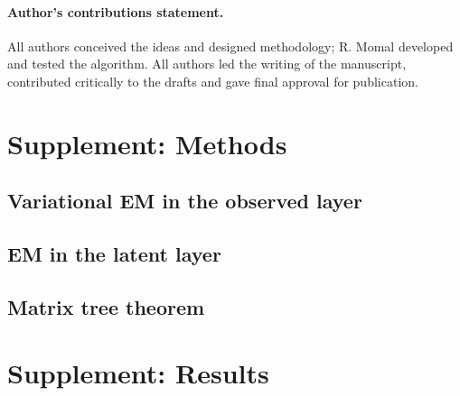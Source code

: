 \documentclass[a4paper,11pt]{article}
\begin{document}
\paragraph{Author's contributions statement.}

All authors conceived the ideas and designed methodology; R. Momal developed and tested the algorithm. All authors led the writing of the manuscript, contributed critically to the drafts and gave final approval for publication.

%



\begin{appendix}
\newpage
\resetlinenumber
\section{Supplement: Methods}
\subsection{Variational EM in the observed layer} \label{app:VEM} 
\subsection{EM in the latent layer} \label{app:EM} 
\subsection{Matrix tree theorem}\label{app:MTT} 

\section{Supplement: Results}
\label{app:results} 

\end{appendix}
\end{document}
